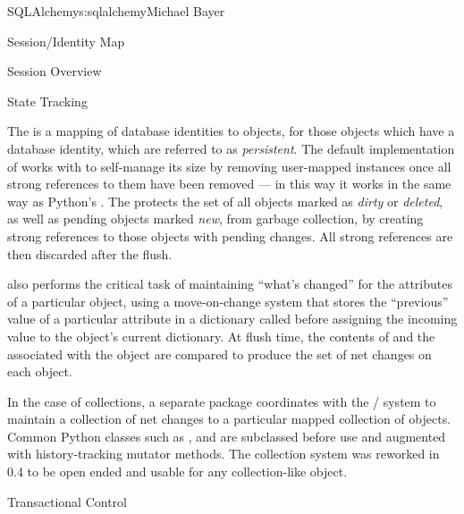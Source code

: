 \begin{aosachapter}{SQLAlchemy}{s:sqlalchemy}{Michael Bayer}
\begin{aosasect1}{Session/Identity Map}
\begin{aosasect2}{Session Overview}
\end{aosasect2}

\begin{aosasect2}{State Tracking}

The  is a mapping of database identities to  objects,
for those objects which have a database identity, which are referred to as \emph{persistent}.
The default implementation of  works with  to self-manage
its size by removing user-mapped instances once all strong references to them have been removed ---
in this way it works in the same way as Python's .  The 
protects the set of all objects marked as \emph{dirty} or \emph{deleted}, as well as pending objects
marked \emph{new}, from garbage collection, by creating strong
references to those objects with pending changes.  All strong references are then discarded after the flush.

 also performs the critical task of maintaining ``what's changed''
for the attributes of a particular object, using a move-on-change system that
stores the ``previous'' value of a particular attribute in a dictionary
called  before assigning the incoming value to the
object's current dictionary.   At flush time, the contents of 
and the  associated with the object are compared to produce
the set of net changes on each object.

In the case of collections, a separate  package coordinates
with the /
system to maintain a collection of net changes to a particular mapped collection of
objects.   Common Python classes such as ,  and  are subclassed
before use and augmented with history-tracking mutator methods.   The collection system
was reworked in 0.4 to be open ended and usable for any collection-like object.

\end{aosasect2}

\begin{aosasect2}{Transactional Control}


\end{aosasect2}
\end{aosasect1}
\end{aosachapter}
